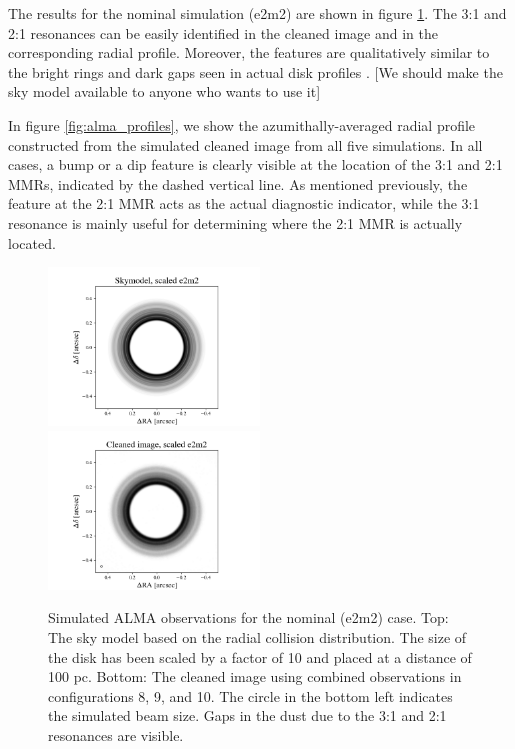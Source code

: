 \documentclass[twocolumn]{aastex63}
\begin{document}
The results for the nominal simulation (e2m2) are shown in figure \ref{fig:alma_sim_obs}. The 3:1 and 2:1 resonances can be easily identified in the 
cleaned image and in the corresponding radial profile.  Moreover, the features are qualitatively similar to the bright rings and dark gaps seen in actual 
disk profiles \citep{2015ApJ...808L...3A}. [We should make the sky model available to anyone who wants to use it]

In figure \ref{fig:alma_profiles}, we show the azumithally-averaged radial profile constructed from the simulated cleaned image from all five 
simulations. In all cases, a bump or a dip feature is clearly visible at the location of the 3:1 and 2:1 MMRs, indicated by the dashed vertical line. 
As mentioned previously, the feature at the 2:1 MMR acts as the actual diagnostic indicator, while the 3:1 resonance is mainly useful for 
determining where the 2:1 MMR is actually located.

\begin{figure}
\begin{center}
    \includegraphics[width=0.5\textwidth]{alma/skymodel_e2m2.png}
    \includegraphics[width=0.5\textwidth]{alma/xy_e2m2.png}
    \caption{Simulated ALMA observations for the nominal (e2m2) case.  Top: The sky model based on the radial collision distribution. The size of the disk has been scaled by a factor of 10 and placed at  a distance of 100 pc. Bottom: The cleaned image using combined observations in configurations 8, 9, and 10. The circle in the bottom left indicates the simulated beam size. Gaps in the dust due to the 3:1 and 2:1 resonances are visible. \label{fig:alma_sim_obs}}
\end{center}
\end{figure}
\end{document}
